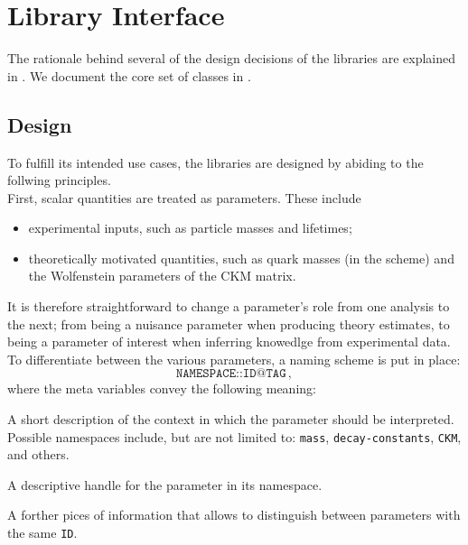 
\chapter{Library Interface}
\label{ch:interface}

The rationale behind several of the design decisions of the \EOS libraries are
explained in . We document the core set of \cpp
classes in .


\section{Design}
\label{sec:interface:design}

To fulfill its intended use cases, the \EOS libraries are designed by abiding
to the follwing principles.\\

First, scalar quantities are treated as parameters.
These include
\begin{itemize}
    \item experimental inputs, such as particle masses and lifetimes;
    \item theoretically motivated quantities, such as quark masses
        (\eg in the \MSbar scheme) and the Wolfenstein parameters of the CKM matrix.
\end{itemize}
It is therefore straightforward to change a parameter's role from one analysis to the next;
\eg from being a nuisance parameter when producing theory estimates, to being a parameter
of interest when inferring knowedlge from experimental data. To differentiate between the
various parameters, a naming scheme is put in place:
\begin{equation}
    \texttt{NAMESPACE::ID@TAG}\,,
\end{equation}
where the meta variables convey the following meaning:
\begin{description}[leftmargin=!,labelwidth=.15\textwidth]
    \item[\texttt{NAMESPACE}]
            A short description of the context in which the parameter should be
            interpreted. Possible namespaces include, but are not limited to: \texttt{mass},
        \texttt{decay-constants}, \texttt{CKM}, and others. \\
    \item[\texttt{ID}]
            A descriptive handle for the parameter in its namespace.\\
    \item[\texttt{TAG}]
            A forther pices of information that allows to distinguish between
            parameters with the same \texttt{ID}.\\
\end{description}


